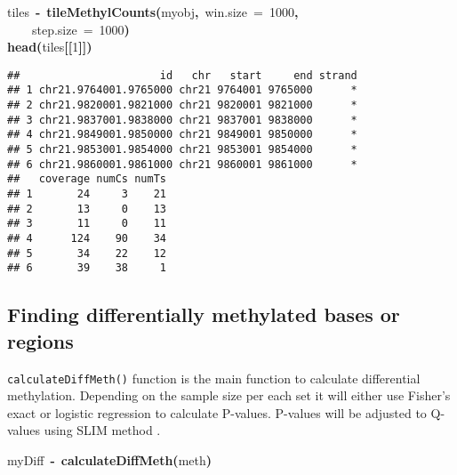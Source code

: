 \documentclass{article}
\makeatletter
\newcommand{\hlnumber}[1]{\textcolor[rgb]{0,0,0}{#1}}%
\newcommand{\hlfunctioncall}[1]{\textcolor[rgb]{.5,0,.33}{\textbf{#1}}}%
\newcommand{\hlkeyword}[1]{\textbf{#1}}%
\newcommand{\hlargument}[1]{\textcolor[rgb]{.69,.25,.02}{#1}}%
\newcommand{\hlassignement}[1]{\textbf{#1}}%
\newcommand{\hlsymbol}[1]{#1}%
\newcommand{\hlstd}[1]{\textcolor[rgb]{0,0,0}{#1}}%
\newenvironment{kframe}{%
 \def\FrameCommand##1{\hskip\@totalleftmargin \hskip-\fboxsep
 \colorbox{shadecolor}{##1}\hskip-\fboxsep
     \hskip-\linewidth \hskip-\@totalleftmargin \hskip\columnwidth}%
 \MakeFramed {\advance\hsize-\width
   \@totalleftmargin\z@ \linewidth\hsize
   \@setminipage}}%
 {\par\unskip\endMakeFramed}
\newenvironment{knitrout}{}{} %
\makeatother
\begin{document}
\begin{knitrout}
\color{fgcolor}\begin{kframe}
\begin{flushleft}
\ttfamily\noindent
\hlsymbol{tiles}{\ }\hlassignement{\usebox{\hlnormalsizeboxlessthan}-}{\ }\hlfunctioncall{tileMethylCounts}\hlkeyword{(}\hlsymbol{myobj}\hlkeyword{,}{\ }\hlargument{win.size}{\ }\hlargument{=}{\ }\hlnumber{1000}\hlkeyword{,}\hspace*{\fill}\\
\hlstd{}{\ }{\ }{\ }{\ }\hlargument{step.size}{\ }\hlargument{=}{\ }\hlnumber{1000}\hlkeyword{)}\hspace*{\fill}\\
\hlstd{}\hlfunctioncall{head}\hlkeyword{(}\hlsymbol{tiles}\hlkeyword{[[}\hlnumber{1}\hlkeyword{]}\hlkeyword{]}\hlkeyword{)}\mbox{}
\normalfont
\end{flushleft}
\begin{verbatim}
##                      id   chr   start     end strand
## 1 chr21.9764001.9765000 chr21 9764001 9765000      *
## 2 chr21.9820001.9821000 chr21 9820001 9821000      *
## 3 chr21.9837001.9838000 chr21 9837001 9838000      *
## 4 chr21.9849001.9850000 chr21 9849001 9850000      *
## 5 chr21.9853001.9854000 chr21 9853001 9854000      *
## 6 chr21.9860001.9861000 chr21 9860001 9861000      *
##   coverage numCs numTs
## 1       24     3    21
## 2       13     0    13
## 3       11     0    11
## 4      124    90    34
## 5       34    22    12
## 6       39    38     1
\end{verbatim}
\end{kframe}
\end{knitrout}


\subsection{Finding differentially methylated bases or regions}
\texttt{calculateDiffMeth()} function is the main function to calculate differential methylation. Depending on the sample size per each set it will either use Fisher's exact or logistic regression to calculate P-values. P-values will be adjusted to Q-values using SLIM method \cite{Wang2011a}.
\begin{knitrout}
\color{fgcolor}\begin{kframe}
\begin{flushleft}
\ttfamily\noindent
\hlsymbol{myDiff}{\ }\hlassignement{\usebox{\hlnormalsizeboxlessthan}-}{\ }\hlfunctioncall{calculateDiffMeth}\hlkeyword{(}\hlsymbol{meth}\hlkeyword{)}\mbox{}
\normalfont
\end{flushleft}
\end{kframe}
\end{knitrout}
\end{document}
